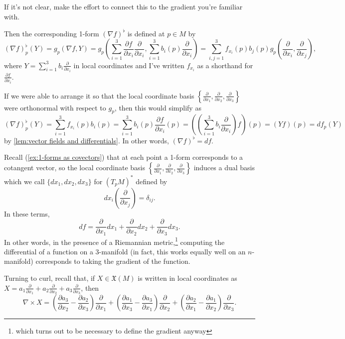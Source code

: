 \begin{exercise}
	If it's not clear, make the effort to connect this to the gradient you're familiar with.
\end{exercise}

Then the corresponding 1-form $(\nabla f)^\flat$ is defined at $p \in M$ by
\[
	(\nabla f)_p^\flat(Y) = g_p(\nabla f, Y) = g_p\left(\sum_{i=1}^3 \frac{\partial f}{\partial x_i} \frac{\partial}{\partial x_i}, \sum_{i=1}^3 b_i(p) \frac{\partial }{\partial x_i}\right) = \sum_{i,j=1}^3 f_{x_i}(p) b_j(p) g_p\left(\frac{\partial }{\partial x_i}, \frac{\partial }{\partial x_j}\right),
\]
where $Y = \sum_{i=1}^3 b_i \frac{\partial }{\partial x_i}$ in local coordinates and I've written $f_{x_i}$ as a shorthand for $\frac{\partial f}{\partial x_i}$.

If we were able to arrange it so that the local coordinate basis $\left\{ \frac{\partial }{\partial x_1},\frac{\partial }{\partial x_2},\frac{\partial }{\partial x_3}\right\}$ were orthonormal with respect to $g_p$, then this would simplify as
\[
	(\nabla f)_p^\flat(Y) = \sum_{i=1}^3 f_{x_i}(p) b_i(p) = \sum_{i=1}^3  b_i(p) \frac{\partial f}{\partial x_i}(p) = \left(\left(\sum_{i=1}^3  b_i \frac{\partial}{\partial x_i}\right)f\right)(p) = (Yf)(p) = df_p(Y)
\]
by \cref{lem:vector fields and differentials}. In other words, $(\nabla f)^\flat = df$.

Recall (\cref{ex:1-forms as covectors}) that at each point a 1-form corresponds to a cotangent vector, so the local coordinate basis $\left\{ \frac{\partial }{\partial x_1},\frac{\partial }{\partial x_2},\frac{\partial }{\partial x_3}\right\}$ induces a dual basis which we call $\{dx_1, dx_2, dx_3\}$ for $\left(T_pM\right)^\ast$ defined by 
\[
	dx_i\left(\frac{\partial}{\partial x_j}\right) = \delta_{ij}.
\]
In these terms, 
\[
	df = \frac{\partial }{\partial x_1} dx_1 + \frac{\partial }{\partial x_2} dx_2 + \frac{\partial }{\partial x_3}dx_3.
\]
In other words, in the presence of a Riemannian metric,\footnote{which turns out to be necessary to define the gradient anyway} computing the differential of a function on a 3-manifold (in fact, this works equally well on an $n$-manifold) corresponds to taking the gradient of the function.

Turning to curl, recall that, if $X \in \mathfrak{X}(M)$ is written in local coordinates as $X = a_1 \frac{\partial }{\partial x_1} + a_2 \frac{\partial }{\partial x_2} + a_3 \frac{\partial }{\partial x_3}$, then
\[
	\nabla \times X = \left(\frac{\partial a_3}{\partial x_2} - \frac{\partial a_2}{\partial x_3} \right)\frac{\partial }{\partial x_1} + \left( \frac{\partial a_1}{\partial x_3} - \frac{\partial a_3}{\partial x_1} \right) \frac{\partial }{\partial x_2} + \left( \frac{\partial a_2}{\partial x_1} - \frac{\partial a_1}{\partial x_2} \right) \frac{\partial }{\partial x_3}.
\]


